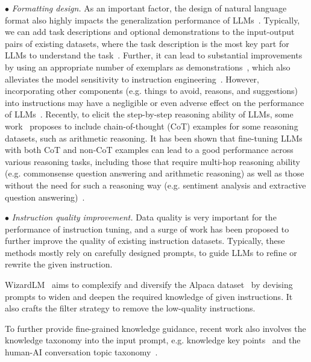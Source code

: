 $\bullet$ \emph{Formatting design.} As an important factor, the design of natural language format also highly impacts the generalization performance of LLMs~\cite{Wang-EMNLP-2022-Super}. Typically, we can add task descriptions and optional demonstrations to the input-output pairs of existing datasets, where the task description is the most key part for LLMs to understand the task~\cite{Wang-EMNLP-2022-Super}. Further, it can lead to substantial improvements by using an appropriate number of exemplars as demonstrations~\cite{Chung-arxiv-2022-Scaling}, which also alleviates the model sensitivity to instruction engineering~\cite{Wei-ICLR-2022-Finetuned,Chung-arxiv-2022-Scaling}. However, incorporating other components (e.g. things to avoid, reasons, and suggestions) into instructions may have a negligible or even adverse effect on the performance of LLMs~\cite{Mishra-ACL-2022-Cross, Wang-EMNLP-2022-Super}. Recently, to elicit the step-by-step reasoning ability of LLMs, some work~\cite{Chung-arxiv-2022-Scaling}  proposes to include chain-of-thought (CoT) examples for some reasoning datasets, such as arithmetic reasoning. It has been shown that fine-tuning LLMs with both CoT and non-CoT examples can lead to a good performance across various reasoning tasks,  including those that require multi-hop reasoning ability (e.g. commonsense question answering and arithmetic reasoning) as well as those without the need for such a reasoning  way (e.g. sentiment analysis and  extractive question answering)~\cite{Chung-arxiv-2022-Scaling,Iyer-arxiv-2022-OPT}.

$\bullet$ {\emph{Instruction quality improvement.}} Data quality is very important for the performance of instruction tuning, and a surge of work has been proposed to further improve the quality of existing instruction datasets. Typically, these methods mostly rely on carefully designed prompts, to guide LLMs to refine or rewrite the given instruction.

WizardLM~\cite{Xu-arxiv-2023-WizardLM} aims to complexify and diversify the Alpaca dataset~\cite{alpaca} by devising prompts to widen and deepen the required knowledge of given instructions. It also crafts the filter strategy to remove the low-quality instructions.

To further provide fine-grained knowledge guidance, recent work also involves the knowledge taxonomy into the input prompt, e.g. knowledge key points~\cite{Huang-arxiv-2024-Key} and the human-AI conversation topic taxonomy~\cite{Ding-2023-EMNLP-Enhancing}. 

